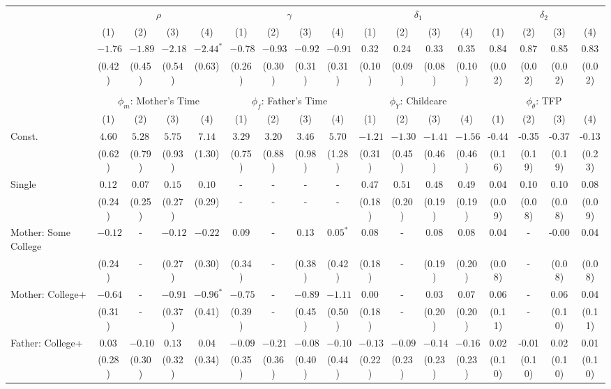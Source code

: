 \begin{tabular}{lcccccccccccccccc}\\\toprule
 & \multicolumn{4}{c}{$\rho$} & \multicolumn{4}{c}{$\gamma$} & \multicolumn{4}{c}{$\delta_{1}$} & \multicolumn{4}{c}{$\delta_{2}$} \\
&(1)&(2)&(3)&(4)&(1)&(2)&(3)&(4)&(1)&(2)&(3)&(4)&(1)&(2)&(3)&(4)\\\cmidrule(r){2-5}\cmidrule(r){6-9}\cmidrule(r){10-13}\cmidrule(r){14-17}
&$-1.76$&$-1.89$&$-2.18$&$-2.44^{*}$&$-0.78$&$-0.93$&$-0.92$&$-0.91$&0.32&0.24&0.33&0.35&0.84&0.87&0.85&0.83\\
&(0.42)&(0.45)&(0.54)&(0.63)&(0.26)&(0.30)&(0.31)&(0.31)&(0.10)&(0.09)&(0.08)&(0.10)&(0.02)&(0.02)&(0.02)&(0.02)\\
&&&&&&&&&&&&&&&&\\
 & \multicolumn{4}{c}{$\phi_{m}$: Mother's Time} & \multicolumn{4}{c}{$\phi_{f}$: Father's Time} & \multicolumn{4}{c}{$\phi_{Y}$: Childcare} & \multicolumn{4}{c}{$\phi_{\theta}$: TFP} \\
&(1)&(2)&(3)&(4)&(1)&(2)&(3)&(4)&(1)&(2)&(3)&(4)&(1)&(2)&(3)&(4)\\\cmidrule(r){2-5}\cmidrule(r){6-9}\cmidrule(r){10-13}\cmidrule(r){14-17}
Const.&$4.60$&$5.28$&$5.75$&$7.14$&$3.29$&$3.20$&$3.46$&$5.70$&$-1.21$&$-1.30$&$-1.41$&$-1.56$&-0.44&-0.35&-0.37&-0.13\\
&(0.62)&(0.79)&(0.93)&(1.30)&(0.75)&(0.88)&(0.98)&(1.28)&(0.31)&(0.45)&(0.46)&(0.46)&(0.16)&(0.19)&(0.19)&(0.23)\\
Single&$0.12$&$0.07$&$0.15$&$0.10$&-&-&-&-&$0.47$&$0.51$&$0.48$&$0.49$&0.04&0.10&0.10&0.08\\
&(0.24)&(0.25)&(0.27)&(0.29)&-&-&-&-&(0.18)&(0.20)&(0.19)&(0.19)&(0.09)&(0.08)&(0.08)&(0.09)\\
Mother: Some College&$-0.12$&-&$-0.12$&$-0.22$&$0.09$&-&$0.13$&$0.05^{*}$&$0.08$&-&$0.08$&$0.08$&0.04&-&-0.00&0.04\\
&(0.24)&-&(0.27)&(0.30)&(0.34)&-&(0.38)&(0.42)&(0.18)&-&(0.19)&(0.20)&(0.08)&-&(0.08)&(0.08)\\
Mother: College+&$-0.64$&-&$-0.91$&$-0.96^{*}$&$-0.75$&-&$-0.89$&$-1.11$&$0.00$&-&$0.03$&$0.07$&0.06&-&0.06&0.04\\
&(0.31)&-&(0.37)&(0.41)&(0.39)&-&(0.45)&(0.50)&(0.18)&-&(0.20)&(0.20)&(0.11)&-&(0.10)&(0.11)\\
Father: College+&$0.03$&$-0.10$&$0.13$&$0.04$&$-0.09$&$-0.21$&$-0.08$&$-0.10$&$-0.13$&$-0.09$&$-0.14$&$-0.16$&0.02&-0.01&0.02&0.01\\
&(0.28)&(0.30)&(0.32)&(0.34)&(0.35)&(0.36)&(0.40)&(0.44)&(0.22)&(0.23)&(0.23)&(0.23)&(0.10)&(0.10)&(0.10)&(0.10)\\

\end{tabular}
